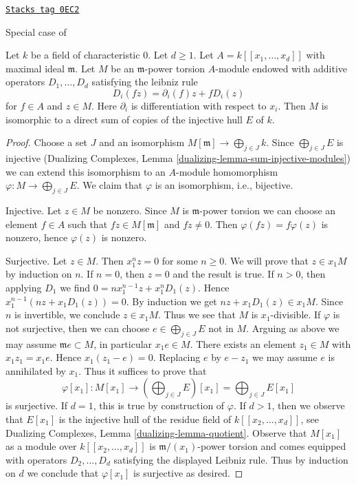 \begin{lemma}
\label{local-cohomology-lemma-structure-torsion-D-module-regular}
\href{https://stacks.math.columbia.edu/tag/0EC2}{\texttt{Stacks tag 0EC2}}

\begin{reference}
Special case of \cite[Theorem 2.4]{Lyubeznik}
\end{reference}
Let $k$ be a field of characteristic $0$. Let $d \geq 1$.
Let $A = k[[x_1, \ldots, x_d]]$ with maximal ideal $\mathfrak m$.
Let $M$ be an $\mathfrak m$-power torsion $A$-module endowed with
additive operators $D_1, \ldots, D_d$ satisfying the leibniz rule
$$
D_i(fz) = \partial_i(f) z + f D_i(z)
$$
for $f \in A$ and $z \in M$. Here $\partial_i$ is
differentiation with respect to $x_i$.
Then $M$ is isomorphic to a direct sum
of copies of the injective hull $E$ of $k$.
\end{lemma}

\begin{proof}
Choose a set $J$ and an isomorphism $M[\mathfrak m] \to \bigoplus_{j \in J} k$.
Since $\bigoplus_{j \in J} E$ is injective
(Dualizing Complexes, Lemma \ref{dualizing-lemma-sum-injective-modules})
we can extend this isomorphism to an $A$-module homomorphism
$\varphi : M \to \bigoplus_{j \in J} E$.
We claim that $\varphi$ is an isomorphism, i.e., bijective.

\medskip\noindent
Injective. Let $z \in M$ be nonzero. Since $M$ is $\mathfrak m$-power torsion
we can choose an element $f \in A$ such that $fz \in M[\mathfrak m]$ and
$fz \not = 0$. Then $\varphi(fz) = f\varphi(z)$ is nonzero, hence
$\varphi(z)$ is nonzero.

\medskip\noindent
Surjective. Let $z \in M$. Then $x_1^n z = 0$ for some $n \geq 0$.
We will prove that $z \in x_1M$ by induction on $n$.
If $n = 0$, then $z = 0$ and the result is true.
If $n > 0$, then applying $D_1$ we find $0 = n x_1^{n - 1} z + x_1^nD_1(z)$.
Hence $x_1^{n - 1}(nz + x_1D_1(z)) = 0$. By induction we get
$nz + x_1D_1(z) \in x_1M$. Since $n$ is invertible, we conclude
$z \in x_1M$. Thus we see that $M$ is $x_1$-divisible.
If $\varphi$ is not surjective, then we can choose
$e \in \bigoplus_{j \in J} E$ not in $M$.
Arguing as above we may assume $\mathfrak m e \subset M$,
in particular $x_1 e \in M$. There exists an element
$z_1 \in M$ with $x_1 z_1 = x_1 e$. Hence
$x_1(z_1 - e) = 0$. Replacing $e$ by $e - z_1$
we may assume $e$ is annihilated by $x_1$.
Thus it suffices to prove that
$$
\varphi[x_1] :
M[x_1]
\longrightarrow
\left(\bigoplus\nolimits_{j \in J} E\right)[x_1] =
\bigoplus\nolimits_{j \in J} E[x_1]
$$
is surjective. If $d = 1$, this is true by construction of $\varphi$.
If $d > 1$, then we observe that $E[x_1]$ is the injective hull
of the residue field of $k[[x_2, \ldots, x_d]]$, see
Dualizing Complexes, Lemma \ref{dualizing-lemma-quotient}.
Observe that $M[x_1]$ as a module over $k[[x_2, \ldots, x_d]]$
is $\mathfrak m/(x_1)$-power torsion and comes
equipped with operators $D_2, \ldots, D_d$ satisfying
the displayed Leibniz rule.
Thus by induction on $d$ we conclude that $\varphi[x_1]$
is surjective as desired.
\end{proof}

